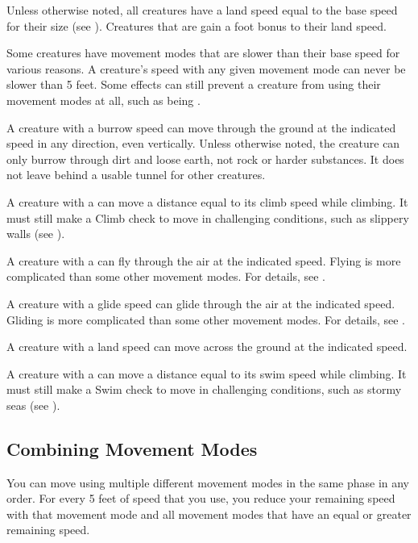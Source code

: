         Unless otherwise noted, all creatures have a land speed equal to the base speed for their size (see ).
        Creatures that are  gain a  foot bonus to their land speed.

        Some creatures have movement modes that are slower than their base speed for various reasons.
        A creature's speed with any given movement mode can never be slower than 5 feet.
        Some effects can still prevent a creature from using their movement modes at all, such as being \immobilized.

        A creature with a burrow speed can move through the ground at the indicated speed in any direction, even vertically.
        Unless otherwise noted, the creature can only burrow through dirt and loose earth, not rock or harder substances.
        It does not leave behind a usable tunnel for other creatures.

        A creature with a  can move a distance equal to its climb speed while climbing.
        It must still make a Climb check to move in challenging conditions, such as slippery walls (see ).

        A creature with a  can fly through the air at the indicated speed.
        Flying is more complicated than some other movement modes.
        For details, see .

        A creature with a glide speed can glide through the air at the indicated speed.
        Gliding is more complicated than some other movement modes.
        For details, see .

        A creature with a land speed can move across the ground at the indicated speed.

        A creature with a  can move a distance equal to its swim speed while climbing.
        It must still make a Swim check to move in challenging conditions, such as stormy seas (see ).

    \subsection{Combining Movement Modes}
        You can move using multiple different movement modes in the same phase in any order.
        For every 5 feet of speed that you use, you reduce your remaining speed with that movement mode and all movement modes that have an equal or greater remaining speed.

